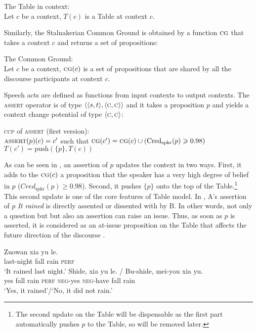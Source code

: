 \documentclass[output=paper,colorlinks,citecolor=brown]{langscibook}
\begin{document}
\ea The Table in context:\\
Let $c$ be a context, $T(c)$ is a Table at context $c$.
\z

Similarly, the Stalnakerian \citeyearpar{Stalnaker} Common Ground is obtained by a function $\textsc{cg}$ that takes a context $c$ and returns a set of propositions:

\ea The Common Ground:\\
Let $c$ be a context,
$\textsc{cg}(c)$ is a set of propositions that are shared by all the discourse participants at context $c$.
\z

 

Speech acts are defined as functions from input contexts to  output contexts.   The \textsc{assert}  operator is of type $\langle\langle s, t\rangle, \langle\textsc{c}, \textsc{c}\rangle\rangle$ and it takes a proposition  $p$ and yields a context change potential of type $\langle\textsc{c}, \textsc{c}\rangle$:

\ea \label{bf3} \textsc{ccp} of \textsc{assert}  (first version):\\ $\textsc{assert}(p)({c}) = {c}'$ such that
\ea\label{bf31} $\textsc{cg}({c}') = \textsc{cg}({c})  \cup (\mathrm{Cred}_\mathrm{spkr}(p) \geqslant 0.98)$
\ex\label{bf32}
 ${T}({c}') = \mathrm{push}(\{p\}, {T}(c))$
 \z
\z

  As can be seen in ,  an assertion of $p$ updates the context in two ways. First,  it adds to the $\textsc{cg}(c)$ a proposition that   the speaker has a very high degree of belief in $p$  ($Cred_{\mathrm{spkr}}(p)\geqslant 0.98$). Second, it pushes $\{p\}$  onto the top of the Table.\footnote{The  second update on the Table will be dispensable as the first part automatically pushes $p$ to the Table, so  will be removed later.}   This second update is one of the core features of  Table model. In ,  A's assertion of $p$ \textit{It rained} is  directly assented or dissented with by B.  In other words, not only a question but but also an assertion can raise an issue. Thus, as soon as $p$  is asserted, it is  considered as an at-issue proposition on the Table that affects the future direction of the discourse \citep{FB, Tonhauser, Northrup}.

 \ea \label{respondt}
 \begin{xlist}
  \gll Zuowan xia yu le.\\
last-night fall rain \textsc{perf} \\
\glt `It rained last night.'
 \gll Shide, xia yu le. / Bu-shide, mei-you xia yu.\\
yes fall rain \textsc{perf} {} \textsc{neg}-yes \textsc{neg}-have fall rain \\
\glt `Yes, it rained'/`No, it did not rain.'
\end{xlist}
 \z
\end{document}
